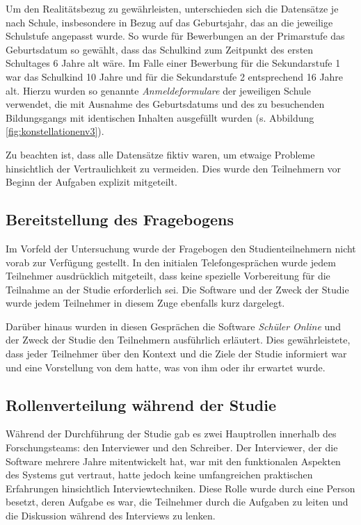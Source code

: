 Um den Realitätsbezug zu gewährleisten, unterschieden sich die Datensätze je nach Schule, insbesondere in Bezug auf das Geburtsjahr, das an die jeweilige Schulstufe angepasst wurde. So wurde für Bewerbungen an der Primarstufe das Geburtsdatum so gewählt, dass das Schulkind zum Zeitpunkt des ersten Schultages 6 Jahre alt wäre. Im Falle einer Bewerbung für die Sekundarstufe 1 war das Schulkind 10 Jahre und für die Sekundarstufe 2 entsprechend 16 Jahre alt.
Hierzu wurden so genannte \textit{Anmeldeformulare} der jeweiligen Schule verwendet, die mit Ausnahme des Geburtsdatums und des zu besuchenden Bildungsgangs mit identischen Inhalten ausgefüllt wurden (s. Abbildung \ref{fig:konstellationenv3}).

Zu beachten ist, dass alle Datensätze fiktiv waren, um etwaige Probleme hinsichtlich der Vertraulichkeit zu vermeiden. Dies wurde den Teilnehmern vor Beginn der Aufgaben explizit mitgeteilt.

\subsection{Bereitstellung des Fragebogens}

Im Vorfeld der Untersuchung wurde der Fragebogen den Studienteilnehmern nicht vorab zur Verfügung gestellt. In den initialen Telefongesprächen wurde jedem Teilnehmer ausdrücklich mitgeteilt, dass keine spezielle Vorbereitung für die Teilnahme an der Studie erforderlich sei. Die Software und der Zweck der Studie wurde jedem Teilnehmer in diesem Zuge ebenfalls kurz dargelegt.

Darüber hinaus wurden in diesen Gesprächen die Software \textit{Schüler Online} und der Zweck der Studie den Teilnehmern ausführlich erläutert. Dies gewährleistete, dass jeder Teilnehmer über den Kontext und die Ziele der Studie informiert war und eine Vorstellung von dem hatte, was von ihm oder ihr erwartet wurde.

\subsection{Rollenverteilung während der Studie}

Während der Durchführung der Studie gab es zwei Hauptrollen innerhalb des Forschungsteams: den Interviewer und den Schreiber. Der Interviewer, der die Software mehrere Jahre mitentwickelt hat, war mit den funktionalen Aspekten des Systems gut vertraut, hatte jedoch keine umfangreichen praktischen Erfahrungen hinsichtlich Interviewtechniken. Diese Rolle wurde durch eine Person besetzt, deren Aufgabe es war, die Teilnehmer durch die Aufgaben zu leiten und die Diskussion während des Interviews zu lenken.


